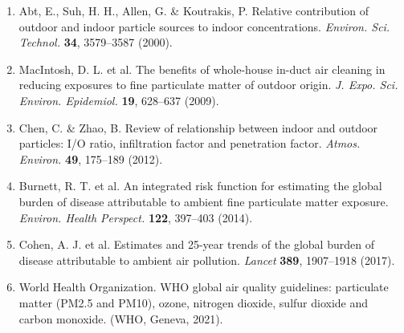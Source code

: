 \documentclass[11pt,a4paper]{article}
\begin{document}
\begin{enumerate}
    \item Abt, E., Suh, H. H., Allen, G. \& Koutrakis, P. Relative contribution of outdoor and indoor particle sources to indoor concentrations. \textit{Environ. Sci. Technol.} \textbf{34}, 3579--3587 (2000).
    
    \item MacIntosh, D. L. et al. The benefits of whole-house in-duct air cleaning in reducing exposures to fine particulate matter of outdoor origin. \textit{J. Expo. Sci. Environ. Epidemiol.} \textbf{19}, 628--637 (2009).
    
    \item Chen, C. \& Zhao, B. Review of relationship between indoor and outdoor particles: I/O ratio, infiltration factor and penetration factor. \textit{Atmos. Environ.} \textbf{49}, 175--189 (2012).
    
    \item Burnett, R. T. et al. An integrated risk function for estimating the global burden of disease attributable to ambient fine particulate matter exposure. \textit{Environ. Health Perspect.} \textbf{122}, 397--403 (2014).
    
    \item Cohen, A. J. et al. Estimates and 25-year trends of the global burden of disease attributable to ambient air pollution. \textit{Lancet} \textbf{389}, 1907--1918 (2017).
    
    \item World Health Organization. WHO global air quality guidelines: particulate matter (PM2.5 and PM10), ozone, nitrogen dioxide, sulfur dioxide and carbon monoxide. (WHO, Geneva, 2021).
\end{enumerate}
\end{document}
